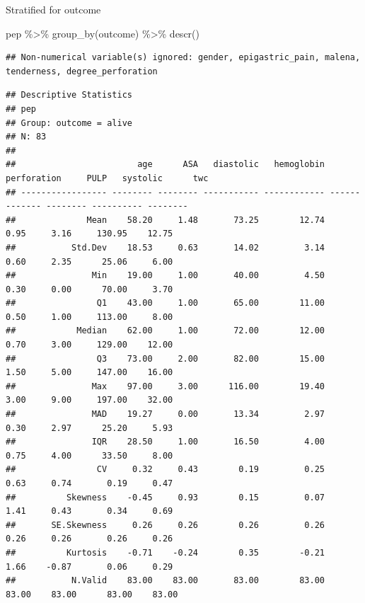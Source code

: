 \documentclass[
  10pt,
]{krantz}
\newenvironment{Shaded}{\begin{snugshade}}{\end{snugshade}}
\newcommand{\FunctionTok}[1]{\textcolor[rgb]{0.00,0.00,0.00}{#1}}
\newcommand{\NormalTok}[1]{#1}
\newcommand{\SpecialCharTok}[1]{\textcolor[rgb]{0.00,0.00,0.00}{#1}}
\begin{document}
Stratified for outcome

\begin{Shaded}
\begin{Highlighting}[]
\NormalTok{pep }\SpecialCharTok{\%\textgreater{}\%} \FunctionTok{group\_by}\NormalTok{(outcome) }\SpecialCharTok{\%\textgreater{}\%}
  \FunctionTok{descr}\NormalTok{()}
\end{Highlighting}
\end{Shaded}

\begin{verbatim}
## Non-numerical variable(s) ignored: gender, epigastric_pain, malena, tenderness, degree_perforation
\end{verbatim}

\begin{verbatim}
## Descriptive Statistics  
## pep  
## Group: outcome = alive  
## N: 83  
## 
##                        age      ASA   diastolic   hemoglobin   perforation     PULP   systolic      twc
## ----------------- -------- -------- ----------- ------------ ------------- -------- ---------- --------
##              Mean    58.20     1.48       73.25        12.74          0.95     3.16     130.95    12.75
##           Std.Dev    18.53     0.63       14.02         3.14          0.60     2.35      25.06     6.00
##               Min    19.00     1.00       40.00         4.50          0.30     0.00      70.00     3.70
##                Q1    43.00     1.00       65.00        11.00          0.50     1.00     113.00     8.00
##            Median    62.00     1.00       72.00        12.00          0.70     3.00     129.00    12.00
##                Q3    73.00     2.00       82.00        15.00          1.50     5.00     147.00    16.00
##               Max    97.00     3.00      116.00        19.40          3.00     9.00     197.00    32.00
##               MAD    19.27     0.00       13.34         2.97          0.30     2.97      25.20     5.93
##               IQR    28.50     1.00       16.50         4.00          0.75     4.00      33.50     8.00
##                CV     0.32     0.43        0.19         0.25          0.63     0.74       0.19     0.47
##          Skewness    -0.45     0.93        0.15         0.07          1.41     0.43       0.34     0.69
##       SE.Skewness     0.26     0.26        0.26         0.26          0.26     0.26       0.26     0.26
##          Kurtosis    -0.71    -0.24        0.35        -0.21          1.66    -0.87       0.06     0.29
##           N.Valid    83.00    83.00       83.00        83.00         83.00    83.00      83.00    83.00

\end{verbatim}
\end{document}
